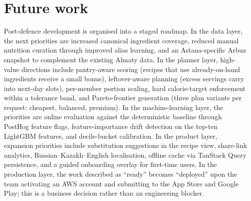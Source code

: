 \section{Future work}

Post-defence development is organised into a staged roadmap. In the data layer, the next priorities are increased canonical ingredient coverage, reduced manual nutrition curation through improved alias learning, and an Astana-specific Arbuz snapshot to complement the existing Almaty data. In the planner layer, high-value directions include pantry-aware scoring (recipes that use already-on-hand ingredients receive a small bonus), leftover-aware planning (excess servings carry into next-day slots), per-member portion scaling, hard calorie-target enforcement within a tolerance band, and Pareto-frontier generation (three plan variants per request: cheapest, balanced, premium). In the machine-learning layer, the priorities are online evaluation against the deterministic baseline through PostHog feature flags, feature-importance drift detection on the top-ten LightGBM features, and decile-bucket calibration. In the product layer, expansion priorities include substitution suggestions in the recipe view, share-link analytics, Russian--Kazakh--English localisation, offline cache via TanStack Query persistence, and a guided onboarding overlay for first-time users. In the production layer, the work described as ``ready'' becomes ``deployed'' upon the team activating an AWS account and submitting to the App Store and Google Play; this is a business decision rather than an engineering blocker.

\clearpage
